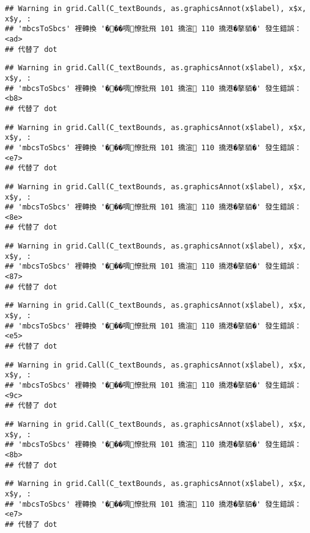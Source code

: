 \documentclass[
]{article}
\begin{document}
\begin{verbatim}
## Warning in grid.Call(C_textBounds, as.graphicsAnnot(x$label), x$x, x$y, :
## 'mbcsToSbcs' 裡轉換 '���啁憭批飛 101 撟渲 110 撟港�摮貊�' 發生錯誤：<ad>
## 代替了 dot
\end{verbatim}

\begin{verbatim}
## Warning in grid.Call(C_textBounds, as.graphicsAnnot(x$label), x$x, x$y, :
## 'mbcsToSbcs' 裡轉換 '���啁憭批飛 101 撟渲 110 撟港�摮貊�' 發生錯誤：<b8>
## 代替了 dot
\end{verbatim}

\begin{verbatim}
## Warning in grid.Call(C_textBounds, as.graphicsAnnot(x$label), x$x, x$y, :
## 'mbcsToSbcs' 裡轉換 '���啁憭批飛 101 撟渲 110 撟港�摮貊�' 發生錯誤：<e7>
## 代替了 dot
\end{verbatim}

\begin{verbatim}
## Warning in grid.Call(C_textBounds, as.graphicsAnnot(x$label), x$x, x$y, :
## 'mbcsToSbcs' 裡轉換 '���啁憭批飛 101 撟渲 110 撟港�摮貊�' 發生錯誤：<8e>
## 代替了 dot
\end{verbatim}

\begin{verbatim}
## Warning in grid.Call(C_textBounds, as.graphicsAnnot(x$label), x$x, x$y, :
## 'mbcsToSbcs' 裡轉換 '���啁憭批飛 101 撟渲 110 撟港�摮貊�' 發生錯誤：<87>
## 代替了 dot
\end{verbatim}

\begin{verbatim}
## Warning in grid.Call(C_textBounds, as.graphicsAnnot(x$label), x$x, x$y, :
## 'mbcsToSbcs' 裡轉換 '���啁憭批飛 101 撟渲 110 撟港�摮貊�' 發生錯誤：<e5>
## 代替了 dot
\end{verbatim}

\begin{verbatim}
## Warning in grid.Call(C_textBounds, as.graphicsAnnot(x$label), x$x, x$y, :
## 'mbcsToSbcs' 裡轉換 '���啁憭批飛 101 撟渲 110 撟港�摮貊�' 發生錯誤：<9c>
## 代替了 dot
\end{verbatim}

\begin{verbatim}
## Warning in grid.Call(C_textBounds, as.graphicsAnnot(x$label), x$x, x$y, :
## 'mbcsToSbcs' 裡轉換 '���啁憭批飛 101 撟渲 110 撟港�摮貊�' 發生錯誤：<8b>
## 代替了 dot
\end{verbatim}

\begin{verbatim}
## Warning in grid.Call(C_textBounds, as.graphicsAnnot(x$label), x$x, x$y, :
## 'mbcsToSbcs' 裡轉換 '���啁憭批飛 101 撟渲 110 撟港�摮貊�' 發生錯誤：<e7>
## 代替了 dot
\end{verbatim}
\end{document}
